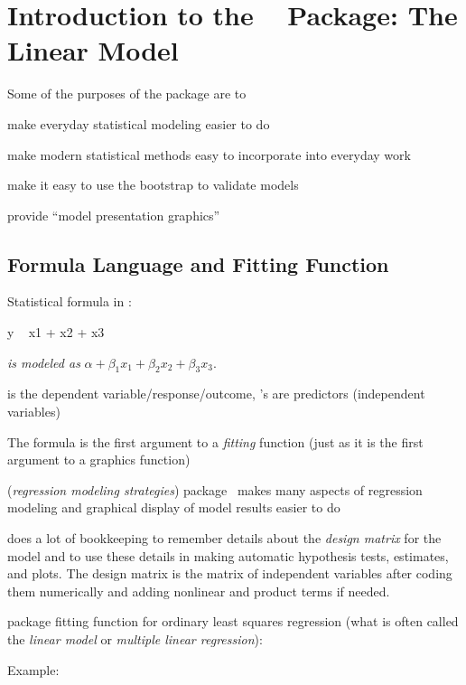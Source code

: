 

\def\apacue{1}
\chapter{Introduction to the \R\  Package: The Linear Model}
Some of the purposes of the  package are to
\bi
\item make everyday statistical modeling easier to do
\item make modern statistical methods easy to incorporate into everyday work
\item make it easy to use the bootstrap to validate models
\item provide ``model presentation graphics''
\ei
  
\section{Formula Language and Fitting Function}%
\bi
\item Statistical formula in \R:
\begin{Schunk}
\begin{Sinput}
y ~ x1 + x2 + x3
\end{Sinput}
\end{Schunk}
 \emph{is modeled as} $\alpha + \beta_{1}x_{1} + \beta_{2}x_{2}
+ \beta_{3} x_{3}$.
\item {} is the dependent variable/response/outcome, 's are
  predictors (independent variables)
\item The formula is the first argument to a \emph{fitting}
  function (just as it is the first argument to a 
  graphics function)
\item {} (\emph{regression modeling strategies}) package~\cite{rrms}
  makes many aspects of regression modeling
  and graphical display of model results easier to do
\item {} does a lot of bookkeeping to
  remember details about the \emph{design matrix} for the model and to
  use these details in making automatic hypothesis tests, estimates,
  and plots.  The design matrix is the matrix of independent variables
  after coding them numerically and adding nonlinear and product terms
  if needed.
\item {} package fitting function for ordinary least squares
  regression (what is often called the \emph{linear model} or
  \emph{multiple linear regression}): 
\item Example:\ipacue
